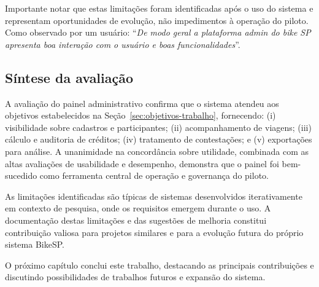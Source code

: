 Importante notar que estas limitações foram identificadas após o uso do sistema e representam oportunidades de evolução, não impedimentos à operação do piloto. Como observado por um usuário: ``\textit{De modo geral a plataforma admin do bike SP apresenta boa interação com o usuário e boas funcionalidades}''.

\subsection{Síntese da avaliação}

A avaliação do painel administrativo confirma que o sistema atendeu aos objetivos estabelecidos na Seção~\ref{sec:objetivos-trabalho}, fornecendo: (i) visibilidade sobre cadastros e participantes; (ii) acompanhamento de viagens; (iii) cálculo e auditoria de créditos; (iv) tratamento de contestações; e (v) exportações para análise. A unanimidade na concordância sobre utilidade, combinada com as altas avaliações de usabilidade e desempenho, demonstra que o painel foi bem-sucedido como ferramenta central de operação e governança do piloto.

As limitações identificadas são típicas de sistemas desenvolvidos iterativamente em contexto de pesquisa, onde os requisitos emergem durante o uso. A documentação destas limitações e das sugestões de melhoria constitui contribuição valiosa para projetos similares e para a evolução futura do próprio sistema BikeSP.

O próximo capítulo conclui este trabalho, destacando as principais contribuições e discutindo possibilidades de trabalhos futuros e expansão do sistema.


